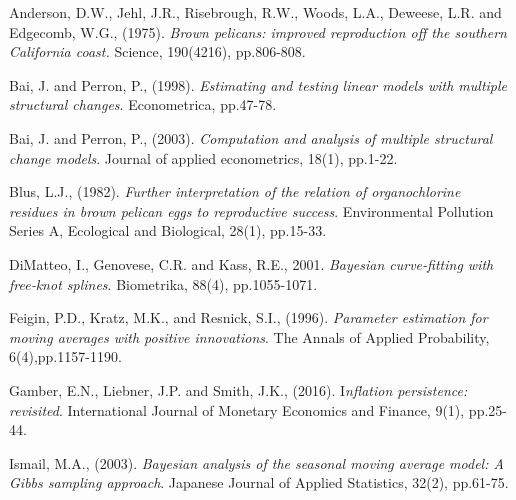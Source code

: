 \documentclass[submit]{smj}
\begin{document}
\begin{thebibliography}{99}

Anderson, D.W., Jehl, J.R., Risebrough, R.W., Woods, L.A., Deweese, L.R. and Edgecomb, W.G., (1975). 
\textit{Brown pelicans: improved reproduction off the southern California coast.} Science, 190(4216), pp.806-808.

Bai, J. and Perron, P., (1998).
\textit{Estimating and testing linear models with multiple structural changes}.
Econometrica, pp.47-78.

Bai, J. and Perron, P., (2003).
\textit{ Computation and analysis of multiple structural change models}.
Journal of applied econometrics, 18(1), pp.1-22.

Blus, L.J., (1982). 
\textit{Further interpretation of the relation of organochlorine residues in brown pelican eggs to reproductive success}. 
Environmental Pollution Series A, Ecological and Biological, 28(1), pp.15-33.




DiMatteo, I., Genovese, C.R. and Kass, R.E., 2001. 
\textit{Bayesian curve‐fitting with free‐knot splines}. 
Biometrika, 88(4), pp.1055-1071.

Feigin, P.D., Kratz, M.K., and Resnick, S.I., (1996).
\textit{Parameter estimation for moving averages with positive innovations}.
The Annals of Applied Probability, 6(4),pp.1157-1190.

Gamber, E.N., Liebner, J.P. and Smith, J.K., (2016). 
I\textit{nflation persistence: revisited}. 
International Journal of Monetary Economics and Finance, 9(1), pp.25-44.

 Ismail, M.A., (2003).
\textit{Bayesian analysis of the seasonal moving average model: A Gibbs sampling approach}.
Japanese Journal of Applied Statistics, 32(2), pp.61-75.


\end{thebibliography}
\end{document}
